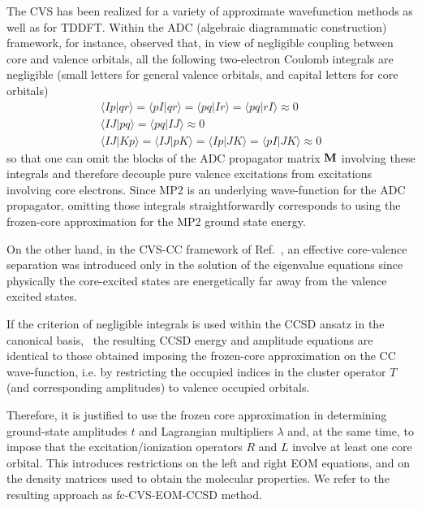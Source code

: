 \documentclass[journal=jctcce,manuscript=article]{achemso}
\begin{document}
The CVS has been realized for a variety of approximate 
wavefunction methods as well as for TDDFT.
Within the ADC (algebraic diagrammatic construction)
framework\cite{Dreuw:ADCrev:2014}, for instance, \citeauthor{wenzel2014}\cite{wenzel2014} observed that, in view of negligible coupling between core and valence orbitals, all the following two-electron Coulomb integrals are negligible
(small letters for general valence orbitals, and capital letters for core orbitals)
\begin{align}
\langle Ip|qr \rangle = \langle pI|qr \rangle = \langle pq|Ir \rangle =
\langle pq|rI \rangle \approx 0 \\\nonumber 
\langle IJ | pq \rangle = \langle pq |IJ \rangle \approx 0 \\\nonumber
\langle IJ | Kp \rangle = \langle IJ | pK \rangle = 
\langle Ip | JK \rangle = \langle pI | JK \rangle \approx 0
\end{align}
so that one can omit the blocks of the ADC propagator matrix ${\bf M}$ involving these integrals and therefore decouple pure valence excitations from excitations involving core electrons.
Since MP2 is an underlying wave-function for the ADC propagator\cite{Dreuw:ADCrev:2014}, omitting those integrals straightforwardly corresponds to using the frozen-core approximation for the MP2 ground state energy.

On the other hand, in the CVS-CC framework of Ref.~, an effective core-valence separation was introduced only in the solution of the eigenvalue equations since physically the core-excited states are energetically far away from the valence excited states.

If the criterion of negligible integrals is used within the CCSD ansatz in the canonical basis,~\cite{Purvis_and_Bartlett} the resulting CCSD energy and amplitude equations are identical to those obtained imposing the frozen-core approximation on the CC wave-function, i.e. by restricting the occupied indices in the cluster operator $T$ (and corresponding amplitudes) to valence occupied orbitals.

Therefore, it is justified to use the frozen core approximation in determining ground-state amplitudes $t$ and Lagrangian multipliers ${\lambda}$ and, at the same time, to impose that the excitation/ionization operators $R$ and $L$ involve at least one core orbital. 
This introduces restrictions on the left and right EOM equations, and on the density matrices used to obtain the molecular properties.   
We refer to the resulting approach as fc-CVS-EOM-CCSD method.
\end{document}

